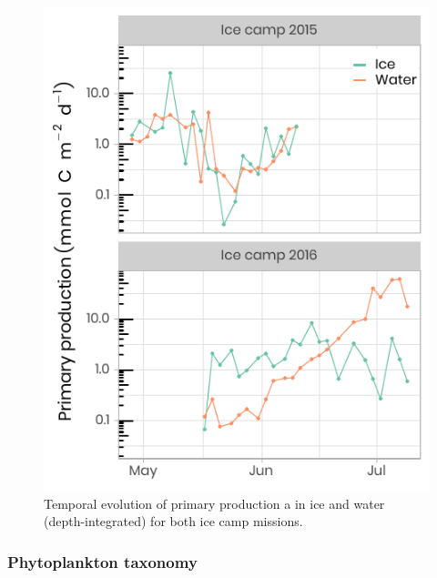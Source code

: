 \documentclass[essd, manuscript]{copernicus}
\begin{document}
\begin{figure}[H]
	\centering
	\includegraphics[scale = 1]{../../../graphs/fig11.pdf}
	\caption{Temporal evolution of primary production a in ice and water (depth-integrated) for both ice camp missions.}
\end{figure}

\subsubsection{Phytoplankton taxonomy}
\end{document}
